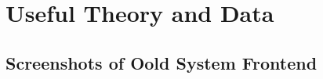 \chapter{Useful Theory and Data}
\label{apdx:theory}

\section{Screenshots of Oold System Frontend}
